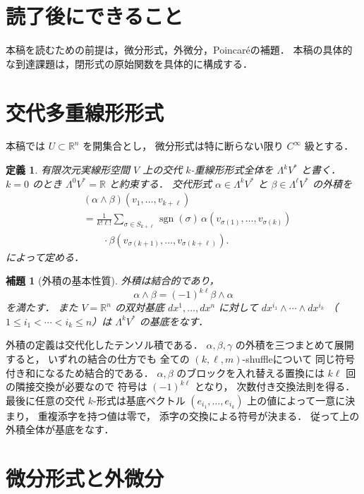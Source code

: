 \documentclass[a5paper,10pt,onecolumn]{jsarticle}
\makeatletter
\theoremstyle{mathnotetheorem}
\newtheorem{definition}[theorem]{定義}
\newtheorem{lemma}[theorem]{補題}
\renewcommand{\proofname}{証明}
\renewenvironment{proof}[1][\proofname]{%
  \par\pushQED{\qed}\normalfont\topsep4\p@\@plus2\p@\relax
  \trivlist\item[\hskip\labelsep\bfseries #1]\ignorespaces
}{\popQED\endtrivlist\@endpefalse}
\makeatother
\begin{document}
\section*{読了後にできること}
本稿を読むための前提は，微分形式，外微分，Poincaréの補題．
本稿の具体的な到達課題は，閉形式の原始関数を具体的に構成する．

\section{交代多重線形形式}

本稿では $U\subset\mathbb R^n$ を開集合とし，
微分形式は特に断らない限り $C^\infty$ 級とする．

\begin{definition}
有限次元実線形空間 $V$ 上の交代 $k$-重線形形式全体を
$\Lambda^kV^*$ と書く．$k=0$ のとき
$\Lambda^0V^*=\mathbb R$ と約束する．
交代形式 $\alpha\in\Lambda^kV^*$ と
$\beta\in\Lambda^\ell V^*$ の\emph{外積}を
\[
 \begin{aligned}
 &(\alpha\wedge\beta)(v_1,\dots,v_{k+\ell})\\
 &=\frac1{k!\ell!}\sum_{\sigma\in S_{k+\ell}}
   \operatorname{sgn}(\sigma)\,
   \alpha(v_{\sigma(1)},\dots,v_{\sigma(k)})\\
 &\qquad\cdot
   \beta(v_{\sigma(k+1)},\dots,v_{\sigma(k+\ell)}).
 \end{aligned}
\]
によって定める．
\end{definition}

\begin{lemma}[外積の基本性質]\label{lem:wedge}
外積は結合的であり，
\[
 \alpha\wedge\beta=(-1)^{k\ell}\beta\wedge\alpha
\]
を満たす．
また $V=\mathbb R^n$ の双対基底
$dx^1,\dots,dx^n$ に対して
$dx^{i_1}\wedge\cdots\wedge dx^{i_k}$
（$1\le i_1<\cdots<i_k\le n$）は
$\Lambda^kV^*$ の基底をなす．
\end{lemma}
\begin{proof}
外積の定義は交代化したテンソル積である．
$\alpha,\beta,\gamma$ の外積を三つまとめて展開すると，
いずれの結合の仕方でも
全ての $(k,\ell,m)$-shuffleについて
同じ符号付き和になるため結合的である．
$\alpha,\beta$ のブロックを入れ替える置換には
$k\ell$ 回の隣接交換が必要なので
符号は $(-1)^{k\ell}$ となり，
次数付き交換法則を得る．
最後に任意の交代 $k$-形式は基底ベクトル
$(e_{i_1},\dots,e_{i_k})$ 上の値によって一意に決まり，
重複添字を持つ値は零で，
添字の交換による符号が決まる．
従って上の外積全体が基底をなす．
\end{proof}

\section{微分形式と外微分}
\end{document}
